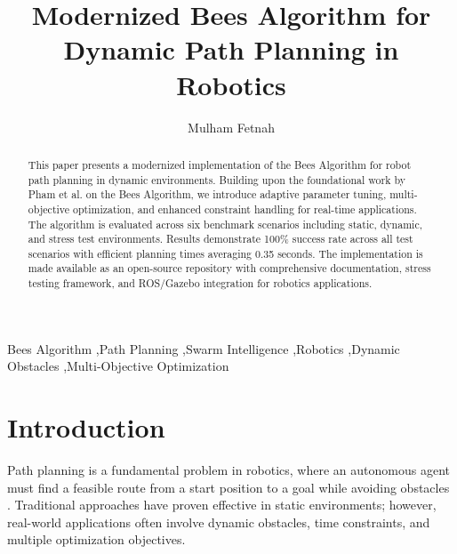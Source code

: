 \documentclass[review]{elsarticle}
\begin{document}
\begin{frontmatter}

\title{Modernized Bees Algorithm for Dynamic Path Planning in Robotics}

\author[1]{Mulham Fetnah}



\begin{abstract}
This paper presents a modernized implementation of the Bees Algorithm for robot path planning in dynamic environments. Building upon the foundational work by Pham et al. on the Bees Algorithm, we introduce adaptive parameter tuning, multi-objective optimization, and enhanced constraint handling for real-time applications. The algorithm is evaluated across six benchmark scenarios including static, dynamic, and stress test environments. Results demonstrate 100\% success rate across all test scenarios with efficient planning times averaging 0.35 seconds. The implementation is made available as an open-source repository with comprehensive documentation, stress testing framework, and ROS/Gazebo integration for robotics applications.
\end{abstract}

\begin{keyword}
Bees Algorithm \sep Path Planning \sep Swarm Intelligence \sep Robotics \sep Dynamic Obstacles \sep Multi-Objective Optimization
\end{keyword}

\end{frontmatter}


\section{Introduction}

Path planning is a fundamental problem in robotics, where an autonomous agent must find a feasible route from a start position to a goal while avoiding obstacles \cite{hart1968,lavalle1998,kavraki1996}. Traditional approaches have proven effective in static environments; however, real-world applications often involve dynamic obstacles, time constraints, and multiple optimization objectives.
\end{document}
